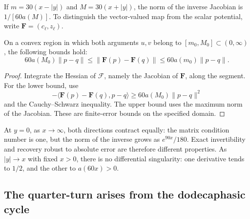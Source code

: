 If \(m=30(x-|y|)\) and \(M=30(x+|y|)\), the norm of the inverse
Jacobian is \(1/[60a(M)]\). To distinguish the vector-valued map from
the scalar potential, write \(\mathbf F=(c_\ell,z_\ell)\).

\begin{proposition}
\label{md:comp:prop-sensibilidad}
On a convex region in which both arguments \(u,v\) belong to
\([m_0,M_0]\subset(0,\infty)\), the following bounds hold:
\begin{equation}
 60a(M_0)\|p-q\|
 \leq\|\mathbf F(p)-\mathbf F(q)\|
 \leq60a(m_0)\|p-q\|.
 \label{md:comp:cotas-finitas}
\end{equation}
\end{proposition}
\begin{proof}
Integrate the Hessian of \(\mathscr F\), namely the Jacobian of
\(\mathbf F\), along the segment. For the lower bound, use
\[
 -\langle\mathbf F(p)-\mathbf F(q),p-q\rangle
 \geq60a(M_0)\|p-q\|^2
\]
and the Cauchy--Schwarz inequality. The upper bound uses the maximum
norm of the Jacobian. These are finite-error bounds on the specified
domain.
\end{proof}

At \(y=0\), as \(x\longrightarrow\infty\), both directions contract
equally: the matrix condition number is one, but the norm of the inverse
grows as \(e^{90x}/180\). Exact invertibility and recovery robust to
absolute error are therefore different properties. As
\(|y|\longrightarrow x\) with fixed \(x>0\), there is no differential
singularity: one derivative tends to \(1/2\), and the other to
\(a(60x)>0\).

\subsection{The quarter-turn arises from the dodecaphasic cycle}
\label{md:comp:cuarto-giro}

